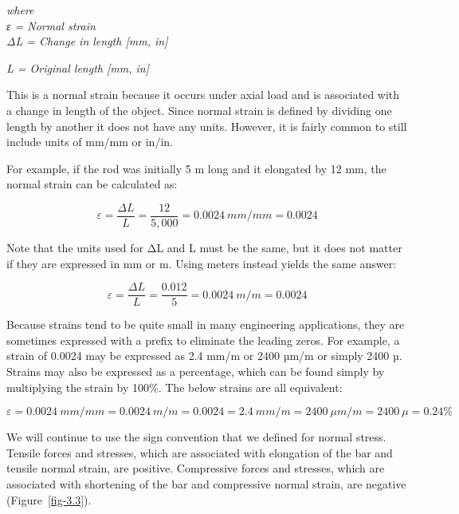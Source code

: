 \documentclass[
  letterpaper,
  DIV=11,
  numbers=noendperiod]{scrreprt}
\theoremstyle{definition}
\theoremstyle{remark}
\begin{document}
\emph{where}\\
\emph{ε = Normal strain}\\
\emph{ΔL = Change in length {[}mm, in{]}}

\emph{L = Original length {[}mm, in{]}}

This is a normal strain because it occurs under axial load and is
associated with a change in length of the object. Since normal strain is
defined by dividing one length by another it does not have any units.
However, it is fairly common to still include units of mm/mm or in/in.

For example, if the rod was initially 5 m long and it elongated by 12
mm, the normal strain can be calculated as:

\[
\varepsilon=\frac{\Delta L}{L}=\frac{12}{5,000}=0.0024{~mm} /{mm}=0.0024
\]

Note that the units used for ΔL and L must be the same, but it does not
matter if they are expressed in mm or m. Using meters instead yields the
same answer:

\[
\varepsilon=\frac{\Delta L}{L}=\frac{0.012}{5}=0.0024{~m}/{m}=0.0024
\]

Because strains tend to be quite small in many engineering applications,
they are sometimes expressed with a prefix to eliminate the leading
zeros. For example, a strain of 0.0024 may be expressed as 2.4 mm/m or
2400 µm/m or simply 2400 µ. Strains may also be expressed as a
percentage, which can be found simply by multiplying the strain by
100\%. The below strains are all equivalent:

\[
\varepsilon=0.0024{~mm}/{mm}=0.0024{~m}/{m}=0.0024=2.4{~mm}/{m}=2400~\mu{m}/{m}=2400 ~\mu=0.24\%
\]

We will continue to use the sign convention that we defined for normal
stress. Tensile forces and stresses, which are associated with
elongation of the bar and tensile normal strain, are positive.
Compressive forces and stresses, which are associated with shortening of
the bar and compressive normal strain, are negative
(Figure~\ref{fig-3.3}).
\end{document}
